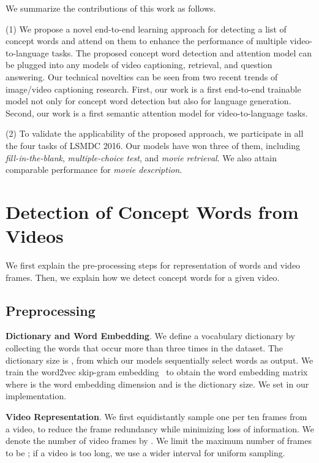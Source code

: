 \documentclass[10pt,twocolumn,letterpaper]{article}
\theoremstyle{nonumberplain}
\begin{document}
We summarize the contributions of this work as follows.

(1)  We propose a  novel end-to-end learning approach for detecting a list of concept words and attend on them to enhance the performance of multiple video-to-language tasks.
The proposed concept word detection and attention model can be plugged into any models of video captioning, retrieval, and question answering.
Our technical novelties can be seen from two recent trends of image/video captioning research.
First, our work is a first end-to-end trainable model not only for concept word detection but also for language generation.
Second, our work is a first semantic attention model for video-to-language tasks. 

(2) To validate the applicability of the proposed approach, we participate in all the four tasks of LSMDC 2016.
Our models have won three of them, including \textit{fill-in-the-blank}, \textit{multiple-choice test}, and \textit{movie retrieval}.
We also attain comparable performance for \textit{movie description}.



\section{Detection of Concept Words from Videos}
\label{sec:approach}

We first explain the pre-processing steps for representation of words and video frames.
Then, we explain how we detect concept words for a given video.

\subsection{Preprocessing}
\label{sec:preproc}

\textbf{Dictionary and Word Embedding}.
We define a vocabulary dictionary  by collecting the words that occur more than three times in the dataset.
The dictionary size is , from which our models sequentially select words as output.
We train the word2vec skip-gram embedding~\cite{Tomas-nips-2013} to obtain the word embedding matrix
 where  is the word embedding dimension and  is the dictionary size.
We set  in our implementation.

\textbf{Video Representation}.
We first equidistantly sample one per ten frames from a video, to reduce the frame redundancy while minimizing loss of information.
We denote the number of video frames by .
We limit the maximum number of frames to be ;
if a video is too long, we use a wider interval for uniform sampling.
\end{document}
